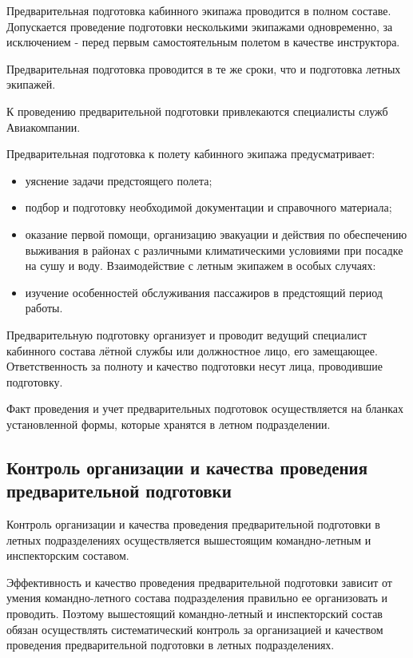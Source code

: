 Предварительная подготовка кабинного экипажа проводится в полном составе. Допускается проведение подготовки несколькими экипажами одновременно, за исключением - перед первым самостоятельным полетом в качестве инструктора.

Предварительная подготовка проводится в те же сроки, что и подготовка летных экипажей.

К проведению предварительной подготовки привлекаются специалисты служб Авиакомпании.

Предварительная подготовка к полету кабинного экипажа предусматривает:
\begin{itemize}
    \item уяснение задачи предстоящего полета;
    \item подбор и подготовку необходимой документации и справочного материала;
    \item оказание первой помощи, организацию эвакуации и действия по обеспечению выживания в районах с различными климатическими условиями при посадке на сушу и воду. Взаимодействие с летным экипажем в особых случаях:
    \item изучение особенностей обслуживания пассажиров в предстоящий период работы.
\end{itemize}

Предварительную подготовку организует и проводит ведущий специалист кабинного состава лётной службы или должностное лицо, его замещающее. Ответственность за полноту и качество подготовки несут лица, проводившие подготовку.

Факт проведения и учет предварительных подготовок осуществляется на бланках установленной формы, которые хранятся в летном подразделении.

\subsection{Контроль организации и качества проведения предварительной подготовки}
\setcounter{subsect}{1}

Контроль организации и качества проведения предварительной подготовки в летных подразделениях осуществляется вышестоящим командно-летным и инспекторским составом.

Эффективность и качество проведения предварительной подготовки зависит от умения командно-летного состава подразделения правильно ее организовать и проводить. Поэтому вышестоящий командно-летный и инспекторский состав обязан осуществлять систематический контроль за организацией и качеством проведения предварительной подготовки в летных подразделениях.

